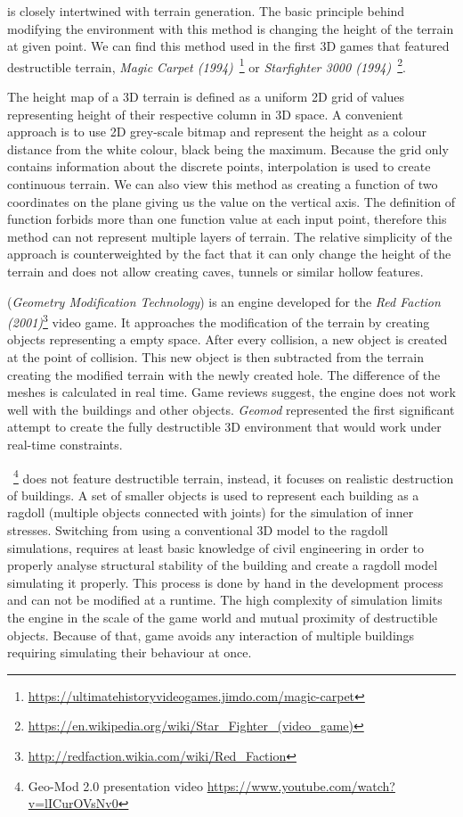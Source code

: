  is closely intertwined with terrain generation. The basic principle behind modifying the environment with this method is changing the height of the terrain at given point. We can find this method used in the first 3D games that featured destructible terrain, \eg \emph{Magic Carpet (1994)}~\footnote{\url{https://ultimatehistoryvideogames.jimdo.com/magic-carpet}} or \emph{Starfighter 3000 (1994)}~\footnote{\url{https://en.wikipedia.org/wiki/Star\_Fighter\_(video\_game)}}.

The height map of a 3D terrain is defined as a uniform 2D grid of values representing height of their respective column in 3D space. A convenient approach is to use 2D grey-scale bitmap and represent the height as a colour distance from the white colour, black being the maximum. Because the grid only contains information about the discrete points, interpolation is used to create continuous terrain. We can also view this method as creating a function of two coordinates on the plane giving us the value on the vertical axis. The definition of function forbids more than one function value at each input point, therefore this method can not represent multiple layers of terrain. The relative simplicity of the approach is counterweighted by the fact that it can only change the height of the terrain and does not allow creating caves, tunnels or similar hollow features.

 (\emph{Geometry Modification Technology}\cite{geomod}) is an engine developed for the \emph{Red Faction (2001)}\footnote{\url{http://redfaction.wikia.com/wiki/Red\_Faction}} video game. It approaches the modification of the terrain by creating objects representing a empty space. After every collision, a new object is created at the point of collision. This new object is then subtracted from the terrain creating the modified terrain with the newly created hole. The difference of the meshes is calculated in real time. Game reviews suggest, the engine does not work well with the buildings and other objects. \emph{Geomod} represented the first significant attempt to create the fully destructible 3D environment that would work under real-time constraints.

~\cite{geomod}\footnote{Geo-Mod 2.0 presentation video \url{https://www.youtube.com/watch?v=lICurOVsNv0}} does not feature destructible terrain, instead, it focuses on realistic destruction of buildings. A set of smaller objects is used to represent each building as a ragdoll (multiple objects connected with joints) for the simulation of inner stresses. Switching from using a conventional 3D model to the ragdoll simulations, requires at least basic knowledge of civil engineering in order to properly analyse structural stability of the building and create a ragdoll model simulating it properly. This process is done by hand in the development process and can not be modified at a runtime. The high complexity of simulation limits the engine in the scale of the game world and mutual proximity of destructible objects. Because of that, game avoids any interaction of multiple buildings requiring simulating their behaviour at once.


